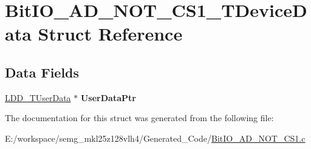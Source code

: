 \hypertarget{struct_bit_i_o___a_d___n_o_t___c_s1___t_device_data}{\section{Bit\-I\-O\-\_\-\-A\-D\-\_\-\-N\-O\-T\-\_\-\-C\-S1\-\_\-\-T\-Device\-Data Struct Reference}
\label{struct_bit_i_o___a_d___n_o_t___c_s1___t_device_data}
}
\subsection*{Data Fields}
\begin{DoxyCompactItemize}
\item 
\hypertarget{struct_bit_i_o___a_d___n_o_t___c_s1___t_device_data_aff6ed456482348d3a902100c451cb509}{\hyperlink{group___p_e___types__module_ga0b66a73f87238a782318aa0be7578e35}{L\-D\-D\-\_\-\-T\-User\-Data} $\ast$ {\bfseries User\-Data\-Ptr}}\label{struct_bit_i_o___a_d___n_o_t___c_s1___t_device_data_aff6ed456482348d3a902100c451cb509}

\end{DoxyCompactItemize}


The documentation for this struct was generated from the following file\-:\begin{DoxyCompactItemize}
\item 
E\-:/workspace/semg\-\_\-mkl25z128vlh4/\-Generated\-\_\-\-Code/\hyperlink{_bit_i_o___a_d___n_o_t___c_s1_8c}{Bit\-I\-O\-\_\-\-A\-D\-\_\-\-N\-O\-T\-\_\-\-C\-S1.\-c}\end{DoxyCompactItemize}

